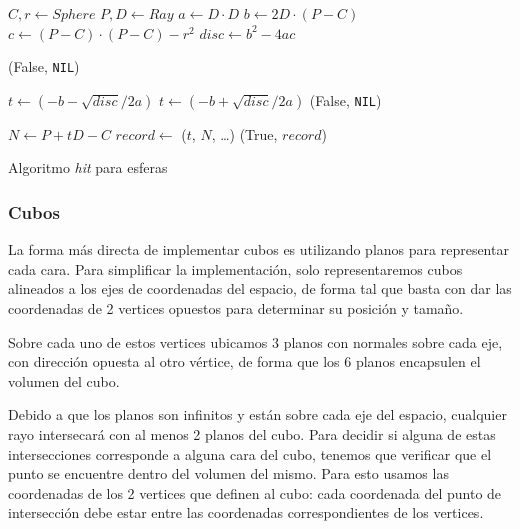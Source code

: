 \begin{algorithm}[H]
\begin{algorithmic}[1]
    \State $C, r \gets Sphere$ 
    \State $P, D \gets Ray$ 
    \State $a \gets D \cdot D$
    \State $b \gets 2D \cdot (P - C)$
    \State $c \gets (P - C) \cdot (P - C) - r^2$
    \State $disc \gets b^2 - 4ac$

        \State \Return (False, \texttt{NIL})
    \EndIf

    \State $t \gets (-b - \sqrt{disc} / 2a)$
        \State $t \gets (-b + \sqrt{disc} / 2a)$
            \State \Return (False, \texttt{NIL})
        \EndIf
    \EndIf

    \State $N \gets P + tD - C$ 
    \State $record \gets$ ($t$, $N$, \dots) 
    \State \Return (True, $record$)
\EndFunction
\end{algorithmic}
\caption{Algoritmo \textit{hit} para esferas}
\label{alg:sphere-hit}
\end{algorithm}

\subsubsection{Cubos}

La forma más directa de implementar cubos es utilizando planos para representar
cada cara. Para simplificar la implementación, solo representaremos cubos
alineados a los ejes de coordenadas del espacio, de forma tal que basta con dar
las coordenadas de 2 vertices opuestos para determinar su posición y tamaño.

Sobre cada uno de estos vertices ubicamos 3 planos con normales sobre cada eje,
con dirección opuesta al otro vértice, de forma que los 6 planos encapsulen el
volumen del cubo.


Debido a que los planos son infinitos y están sobre cada eje del espacio,
cualquier rayo intersecará con al menos 2 planos del cubo. Para decidir si
alguna de estas intersecciones corresponde a alguna cara del cubo, tenemos que
verificar que el punto se encuentre dentro del volumen del mismo. Para esto
usamos las coordenadas de los 2 vertices que definen al cubo: cada coordenada
del punto de intersección debe estar entre las coordenadas correspondientes de
los vertices.

